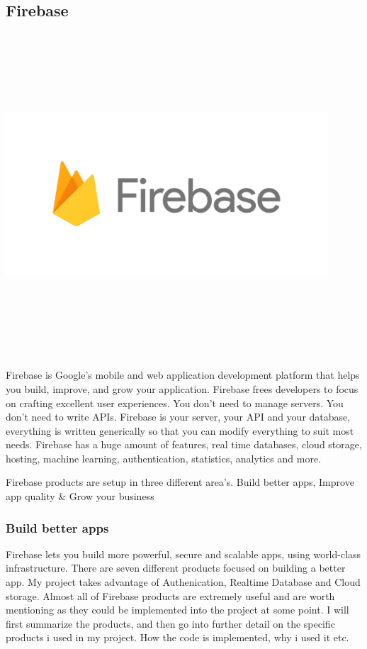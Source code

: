 \newpage
\subsection{Firebase}
\par
\medskip
\begin{center}
    \includegraphics[width=12cm,height=12cm,keepaspectratio]{Images/firebase.png}
\end{center}

Firebase is Google's mobile and web application development platform that helps you build, improve, and grow your application. Firebase frees developers to focus on crafting excellent user experiences. You don't need to manage servers. You don't need to write APIs. Firebase is your server, your API and your database, everything is written generically so that you can modify everything to suit most needs. Firebase has a huge amount of features, real time databases, cloud storage, hosting, machine learning, authentication, statistics, analytics and more.\newline

Firebase products are setup in three different area's. Build better apps, Improve app quality \& Grow your business

\subsubsection{Build better apps} Firebase lets you build more powerful, secure and scalable apps, using world-class infrastructure. There are seven different products focused on building a better app. My project takes advantage of Authenication, Realtime Database and Cloud storage. Almost all of Firebase products are extremely useful and are worth mentioning as they could be implemented into the project at some point.
I will first summarize the products, and then go into further detail on the specific products i used in my project. How the code is implemented, why i used it etc.

